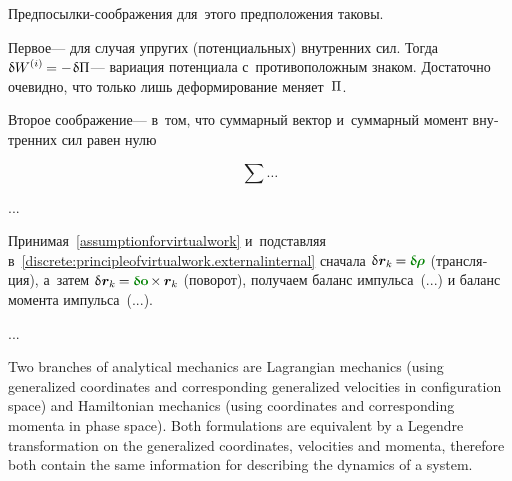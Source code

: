 \begin{otherlanguage}{russian}
\vspace{-0.1em}
Предпосылки-соображения для~этого предположения таковы.

Первое\:--- для случая упругих (потенциальных) внутренних сил.
Тогда ${\variation{\internalwork} = - \hspace{.16ex} \variation{\potentialenergydensity}}$\:--- вариация потенциала с~противоположным знаком.
Достаточно очевидно, что только лишь деформирование меняет~$\Pi$.

Второе соображение\:--- в~том, что суммарный вектор и~суммарный момент внутренних сил равен нулю

\begin{equation*}
\sum \ldots
\end{equation*}

...

Принимая~\eqref{assumptionforvirtualwork} и~подставляя в~\eqref{discrete:principleofvirtualwork.externalinternal} сначала ${\variation{\hspace{.1ex}\locationvector_k} \hspace{-0.16ex} = \hspace{-0.08ex} \constvarvector{\hspace{-0.1ex}\bm{\rho}}}$ (трансляция), а~затем ${\variation{\hspace{.1ex}\locationvector_k} \hspace{-0.16ex} = \hspace{-0.08ex} \constvarvector{\bm{o}} \hspace{-0.2ex} \times \hspace{-0.1ex} \locationvector_k}$ (поворот), получаем баланс импульса~(...) и баланс момента импульса~(...).

...



\end{otherlanguage}



{\small
\setlength{\abovedisplayskip}{2pt}\setlength{\belowdisplayskip}{2pt}
Two branches of analytical mechanics are Lagrangian mechanics (using generalized coordinates and corresponding generalized velocities in configuration space) and Hamiltonian mechanics (using coordinates and corresponding momenta in phase space). Both formulations are equivalent by a Legendre transformation on the generalized coordinates, velocities and momenta, therefore both contain the same information for describing the dynamics of a system.

\par}

